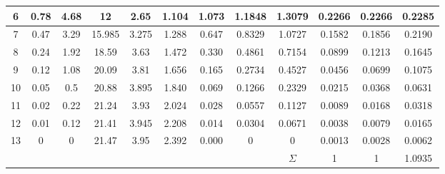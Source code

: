\begin{enumerate}[label={\alph*)}]
\begin{center}
{\begin{tabular}{|c|c|c|c|c|c|c|c|c|c|c|c|}
				      6                     & 0.78       & 4.68          & 12                       & 2.65             & 1.104    & 1.073 & 1.1848           & 1.3079             & 0.2266              & 0.2266                     & 0.2285                       \\ \hline
				      7                     & 0.47       & 3.29          & 15.985                   & 3.275            & 1.288    & 0.647 & 0.8329           & 1.0727             & 0.1582              & 0.1856                     & 0.2190                       \\ \hline
				      8                     & 0.24       & 1.92          & 18.59                    & 3.63             & 1.472    & 0.330 & 0.4861           & 0.7154             & 0.0899              & 0.1213                     & 0.1645                       \\ \hline
				      9                     & 0.12       & 1.08          & 20.09                    & 3.81             & 1.656    & 0.165 & 0.2734           & 0.4527             & 0.0456              & 0.0699                     & 0.1075                       \\ \hline
				      10                    & 0.05       & 0.5           & 20.88                    & 3.895            & 1.840    & 0.069 & 0.1266           & 0.2329             & 0.0215              & 0.0368                     & 0.0631                       \\ \hline
				      11                    & 0.02       & 0.22          & 21.24                    & 3.93             & 2.024    & 0.028 & 0.0557           & 0.1127             & 0.0089              & 0.0168                     & 0.0318                       \\ \hline
				      12                    & 0.01       & 0.12          & 21.41                    & 3.945            & 2.208    & 0.014 & 0.0304           & 0.0671             & 0.0038              & 0.0079                     & 0.0165                       \\ \hline
				      13                    & 0          & 0             & 21.47                    & 3.95             & 2.392    & 0.000 & 0                & 0                  & 0.0013              & 0.0028                     & 0.0062                       \\ \hline
				      \multicolumn{8}{c|}{} & $\Sigma$   & 1             & 1                        & 1.0935                                                                                                                                                        \\ \cline{9-12}
			      \end{tabular}
		      }


\end{center}
\end{enumerate}
